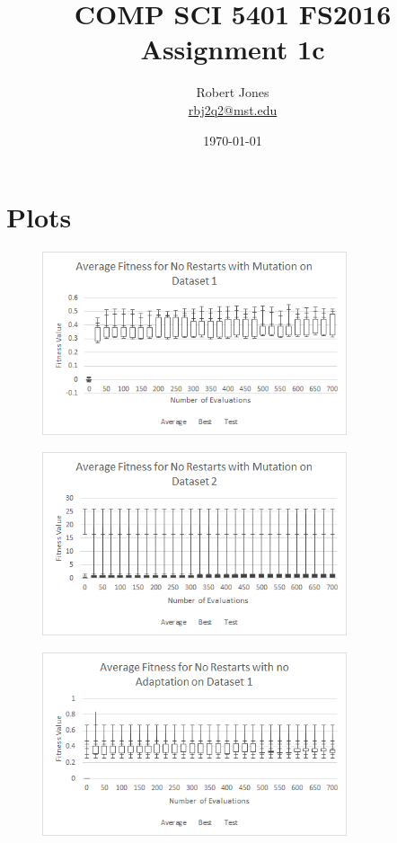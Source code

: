 \documentclass{article}
\title{COMP SCI 5401 FS2016 Assignment 1c}
\author{Robert Jones \\ \href{mailto:rbj2q2@mst.edu}{rbj2q2@mst.edu} }
\date{\today}
\begin{document}
\maketitle

\section{Plots}

\begin{figure}[h]
	\centering
	\includegraphics[width=0.8\textwidth]{res0adaptMuDS1}
\end{figure}
\begin{figure}[h]
	\centering
	\includegraphics[width=0.8\textwidth]{res0adaptMuDS2}
\end{figure}
\newpage
\begin{figure}[h]
	\centering
	\includegraphics[width=0.8\textwidth]{res0adaptNoDS1}
\end{figure}
\end{document}
